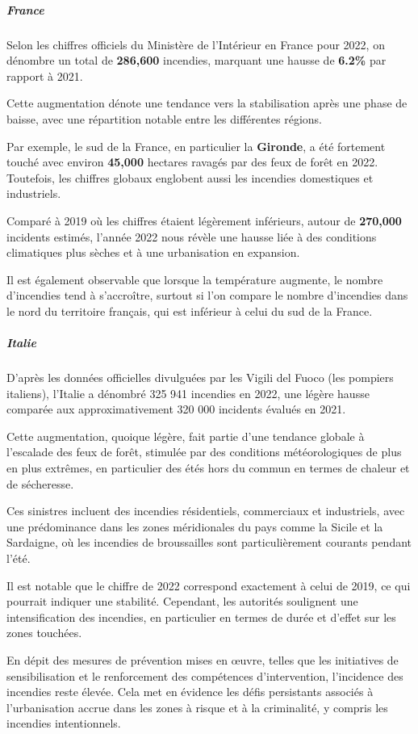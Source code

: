 \documentclass[
]{article}
\begin{document}
\subparagraph{France}\label{france}

Selon les chiffres officiels du Ministère de l'Intérieur en France pour
2022, on dénombre un total de \textbf{286,600} incendies, marquant une
hausse de \textbf{6.2\%} par rapport à 2021.

Cette augmentation dénote une tendance vers la stabilisation après une
phase de baisse, avec une répartition notable entre les différentes
régions.

Par exemple, le sud de la France, en particulier la \textbf{Gironde}, a
été fortement touché avec environ \textbf{45,000} hectares ravagés par
des feux de forêt en 2022. Toutefois, les chiffres globaux englobent
aussi les incendies domestiques et industriels.

Comparé à 2019 où les chiffres étaient légèrement inférieurs, autour de
\textbf{270,000} incidents estimés, l'année 2022 nous révèle une hausse
liée à des conditions climatiques plus sèches et à une urbanisation en
expansion.

Il est également observable que lorsque la température augmente, le
nombre d'incendies tend à s'accroître, surtout si l'on compare le nombre
d'incendies dans le nord du territoire français, qui est inférieur à
celui du sud de la France.

\subparagraph{Italie}\label{italie}

D'après les données officielles divulguées par les Vigili del Fuoco (les
pompiers italiens), l'Italie a dénombré 325 941 incendies en 2022, une
légère hausse comparée aux approximativement 320 000 incidents évalués
en 2021.

Cette augmentation, quoique légère, fait partie d'une tendance globale à
l'escalade des feux de forêt, stimulée par des conditions
météorologiques de plus en plus extrêmes, en particulier des étés hors
du commun en termes de chaleur et de sécheresse.

Ces sinistres incluent des incendies résidentiels, commerciaux et
industriels, avec une prédominance dans les zones méridionales du pays
comme la Sicile et la Sardaigne, où les incendies de broussailles sont
particulièrement courants pendant l'été.

Il est notable que le chiffre de 2022 correspond exactement à celui de
2019, ce qui pourrait indiquer une stabilité. Cependant, les autorités
soulignent une intensification des incendies, en particulier en termes
de durée et d'effet sur les zones touchées.

En dépit des mesures de prévention mises en œuvre, telles que les
initiatives de sensibilisation et le renforcement des compétences
d'intervention, l'incidence des incendies reste élevée. Cela met en
évidence les défis persistants associés à l'urbanisation accrue dans les
zones à risque et à la criminalité, y compris les incendies
intentionnels.
\end{document}
